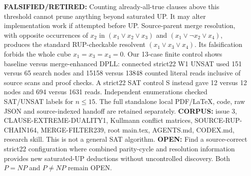 \documentclass{article}
\begin{document}
\textbf{FALSIFIED/RETIRED:} Counting already-all-true clauses above
this threshold cannot prune anything beyond saturated UP.
It may alter implementation work if attempted before UP.
Source-parent merge resolution, with opposite occurrences of
$x_2$ in $(x_1\lor x_2\lor x_3)$ and
$(x_1\lor\neg x_2\lor x_4)$, produces the standard
RUP-checkable resolvent $(x_1\lor x_3\lor x_4)$.
Its falsification forbids the whole cube $x_1=x_3=x_4=0$.
Our 13-case finite control shows baseline versus
merge-enhanced DPLL: connected strict22 W1 UNSAT used
151 versus 65 search nodes and 15158 versus 13848 counted
literal reads inclusive of source scans and proof checks.
A strict22 SAT control S instead gave 12 versus 12
nodes and 694 versus 1631 reads.
Independent enumerations checked SAT/UNSAT labels for $n\le15$.
The full standalone local PDF/LaTeX, code, raw JSON and
source-indexed handoff are retained separately.
\textbf{CORPUS:} issue 3, CLAUSE-EXTREME-DUALITY1,
Kullmann conflict matrices, SOURCE-RUP-CHAIN164,
MERGE-FILTER239, root main.tex, AGENTS.md, CODEX.md,
research skill. This is not a general SAT algorithm.
\textbf{OPEN:} Find a source-correct strict22 configuration
where combined parity-cycle and resolution information provides
new saturated-UP deductions without uncontrolled discovery.
Both $P=NP$ and $P\ne NP$ remain OPEN.
\end{document}

